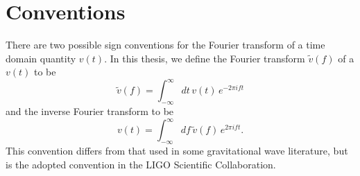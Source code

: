 \section{Conventions}
There are two possible sign conventions for the Fourier transform of a time
domain quantity $v(t)$. In this thesis, we define the Fourier transform
$\tilde{v}(f)$ of a $v(t)$ to be
\begin{equation}
\label{eq:ft}
\tilde{v}(f)=\int_{-\infty}^\infty dt\,v(t)\, e^{- 2 \pi i f t}
\end{equation}
and the inverse Fourier transform to be 
\begin{equation}
\label{eq:ift}
v(t)=\int_{-\infty}^\infty df\,\tilde{v}(f)\, e^{2 \pi i f t}.
\end{equation}
This convention differs from that used in some gravitational wave literature,
but is the adopted convention in the LIGO Scientific Collaboration.



